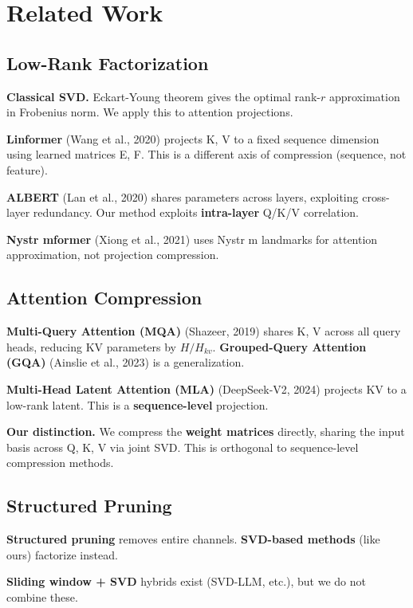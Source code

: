 \section{Related Work}

\subsection{Low-Rank Factorization}

\textbf{Classical SVD.} Eckart-Young theorem gives the optimal rank-$r$ 
approximation in Frobenius norm. We apply this to attention projections.

\textbf{Linformer} (Wang et al., 2020) projects K, V to a fixed sequence dimension 
using learned matrices E, F. This is a different axis of compression 
(sequence, not feature).

\textbf{ALBERT} (Lan et al., 2020) shares parameters across layers, exploiting 
cross-layer redundancy. Our method exploits \textbf{intra-layer} Q/K/V correlation.

\textbf{Nystr mformer} (Xiong et al., 2021) uses Nystr m landmarks for attention 
approximation, not projection compression.

\subsection{Attention Compression}

\textbf{Multi-Query Attention (MQA)} (Shazeer, 2019) shares K, V across all query 
heads, reducing KV parameters by $H/H_{kv}$. \textbf{Grouped-Query Attention (GQA)} 
(Ainslie et al., 2023) is a generalization.

\textbf{Multi-Head Latent Attention (MLA)} (DeepSeek-V2, 2024) projects KV to a 
low-rank latent. This is a \textbf{sequence-level} projection.

\textbf{Our distinction.} We compress the \textbf{weight matrices} directly, sharing 
the input basis across Q, K, V via joint SVD. This is orthogonal to 
sequence-level compression methods.

\subsection{Structured Pruning}

\textbf{Structured pruning} removes entire channels. \textbf{SVD-based methods} 
(like ours) factorize instead.

\textbf{Sliding window + SVD} hybrids exist (SVD-LLM, etc.), but we do not 
combine these.

